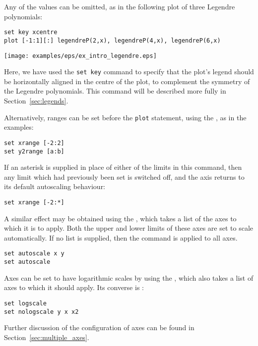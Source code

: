 \noindent Any of the values can be omitted, as in the following plot of
three Legendre polynomials:

\begin{verbatim}
set key xcentre
plot [-1:1][:] legendreP(2,x), legendreP(4,x), legendreP(6,x)
\end{verbatim}
\begin{center}
\texttt{[image: examples/eps/ex\_intro\_legendre.eps]}
\end{center}

\noindent Here, we have used the {\tt set key} command to specify that the
plot's legend should be horizontally aligned in the centre of the plot, to
complement the symmetry of the Legendre polynomials. This command will be
described more fully in Section~\ref{sec:legends}.

Alternatively, ranges can be set before the {\tt plot} statement, using the
, as in the examples:

\begin{verbatim}
set xrange [-2:2]
set y2range [a:b]
\end{verbatim}

If an asterisk is supplied in place of either of the limits in this command, then
any limit which had previously been set is switched off, and the axis returns to
its default autoscaling behaviour:

\begin{verbatim}
set xrange [-2:*]
\end{verbatim}

\noindent A similar effect may be obtained using the ,
which takes a list of the axes to which it is to apply. Both the upper and
lower limits of these axes are set to scale automatically. If no list is
supplied, then the command is applied to all axes.

\begin{verbatim}
set autoscale x y
set autoscale
\end{verbatim}

Axes can be set to have logarithmic scales by using the ,
which also takes a list of axes to which it should apply. Its converse is
:

\begin{verbatim}
set logscale
set nologscale y x x2
\end{verbatim}

Further discussion of the configuration of axes can be found in
Section~\ref{sec:multiple_axes}.

